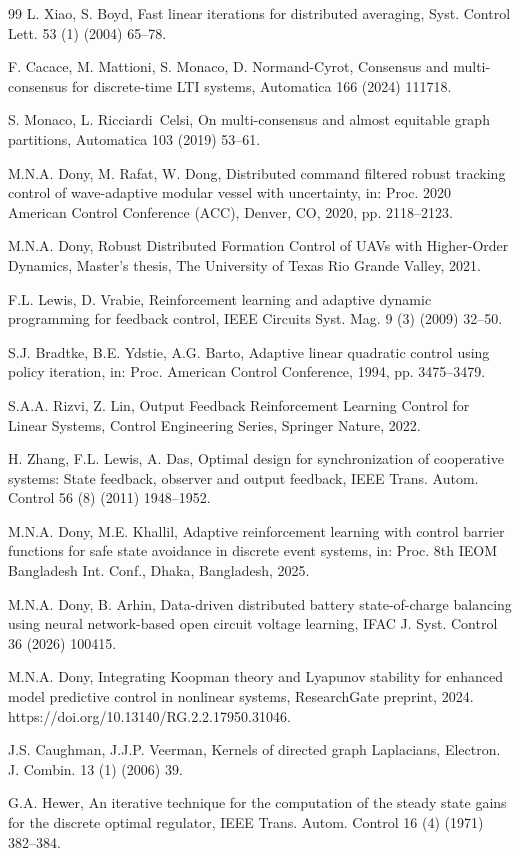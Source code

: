 \documentclass[12pt]{elsarticle}
\theoremstyle{remark}
\begin{document}
\begin{thebibliography}{99}
L. Xiao, S. Boyd, Fast linear iterations for distributed averaging, Syst. Control Lett. 53 (1) (2004) 65--78.

F. Cacace, M. Mattioni, S. Monaco, D. Normand-Cyrot, Consensus and multi-consensus for discrete-time LTI systems, Automatica 166 (2024) 111718.

S. Monaco, L. Ricciardi~Celsi, On multi-consensus and almost equitable graph partitions, Automatica 103 (2019) 53--61.

M.N.A. Dony, M. Rafat, W. Dong, Distributed command filtered robust tracking control of wave-adaptive modular vessel with uncertainty, in: Proc. 2020 American Control Conference (ACC), Denver, CO, 2020, pp. 2118--2123.

M.N.A. Dony, Robust Distributed Formation Control of UAVs with Higher-Order Dynamics, Master's thesis, The University of Texas Rio Grande Valley, 2021.

F.L. Lewis, D. Vrabie, Reinforcement learning and adaptive dynamic programming for feedback control, IEEE Circuits Syst. Mag. 9 (3) (2009) 32--50.

S.J. Bradtke, B.E. Ydstie, A.G. Barto, Adaptive linear quadratic control using policy iteration, in: Proc. American Control Conference, 1994, pp. 3475--3479.

S.A.A. Rizvi, Z. Lin, Output Feedback Reinforcement Learning Control for Linear Systems, Control Engineering Series, Springer Nature, 2022.

H. Zhang, F.L. Lewis, A. Das, Optimal design for synchronization of cooperative systems: State feedback, observer and output feedback, IEEE Trans. Autom. Control 56 (8) (2011) 1948--1952.

M.N.A. Dony, M.E. Khallil, Adaptive reinforcement learning with control barrier functions for safe state avoidance in discrete event systems, in: Proc. 8th IEOM Bangladesh Int. Conf., Dhaka, Bangladesh, 2025.

M.N.A. Dony, B. Arhin, Data-driven distributed battery state-of-charge balancing using neural network-based open circuit voltage learning, IFAC J. Syst. Control 36 (2026) 100415.

M.N.A. Dony, Integrating Koopman theory and Lyapunov stability for enhanced model predictive control in nonlinear systems, ResearchGate preprint, 2024. https://doi.org/10.13140/RG.2.2.17950.31046.

J.S. Caughman, J.J.P. Veerman, Kernels of directed graph Laplacians, Electron. J. Combin. 13 (1) (2006) 39.

G.A. Hewer, An iterative technique for the computation of the steady state gains for the discrete optimal regulator, IEEE Trans. Autom. Control 16 (4) (1971) 382--384.

\end{thebibliography}
\end{document}

